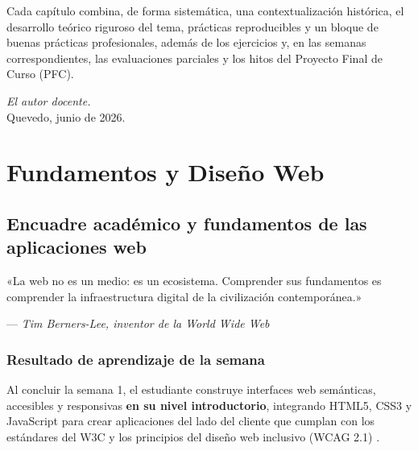 \documentclass[11pt,a4paper,openany]{book}
\begin{document}
Cada capítulo combina, de forma sistemática, una contextualización
histórica, el desarrollo teórico riguroso del tema, prácticas
reproducibles y un bloque de buenas prácticas profesionales, además de
los ejercicios y, en las semanas correspondientes, las evaluaciones
parciales y los hitos del Proyecto Final de Curso (PFC).

\hfill\textit{El autor docente.}\\
\hfill Quevedo, junio de 2026.

\tableofcontents
\listoffigures
\listoftables
\lstlistoflistings

\mainmatter
\newpage

\part{Fundamentos y Diseño Web}
\label{parte:unidad1}


\chapter{Encuadre académico y fundamentos de las aplicaciones web}
\label{cap:semana1}

\epigraph{«La web no es un medio: es un ecosistema. Comprender sus
fundamentos es comprender la infraestructura digital de la civilización
contemporánea.»}{--- \textit{Tim Berners-Lee, inventor de la World Wide Web}}

\section*{Resultado de aprendizaje de la semana}
Al concluir la semana 1, el estudiante construye interfaces web
semánticas, accesibles y responsivas \textbf{en su nivel introductorio},
integrando HTML5, CSS3 y JavaScript para crear aplicaciones del lado
del cliente que cumplan con los estándares del W3C y los principios del
diseño web inclusivo (WCAG 2.1) \cite{w3c2018wcag}.
\end{document}

